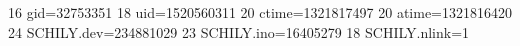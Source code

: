 16 gid=32753351
18 uid=1520560311
20 ctime=1321817497
20 atime=1321816420
24 SCHILY.dev=234881029
23 SCHILY.ino=16405279
18 SCHILY.nlink=1
